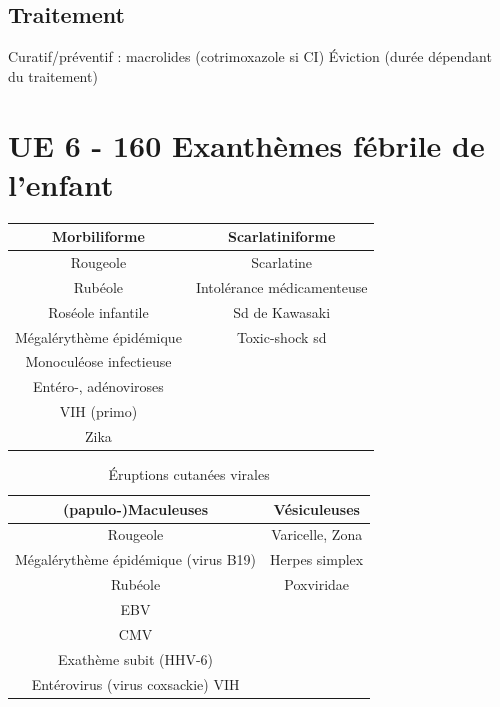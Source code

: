\subsection{Traitement}

Curatif/préventif : macrolides (cotrimoxazole si CI) Éviction (durée
dépendant du traitement) 

\section{UE 6 - 160 Exanthèmes fébrile de l'enfant}

\begin{table}[htpb]
  \centering
  \begin{tabular}{cc}
    \toprule
    Morbiliforme & Scarlatiniforme\\
    \midrule
    Rougeole & Scarlatine\\
    Rubéole & Intolérance médicamenteuse\\
    Roséole infantile & Sd de Kawasaki\\
    Mégalérythème épidémique & Toxic-shock sd\\
    Monoculéose infectieuse & \\
    Entéro-, adénoviroses & \\
    VIH (primo) & \\
    Zika  & \\
    \bottomrule
  \end{tabular}
\end{table}

\begin{table}[htpb]
  \centering
  \caption{Éruptions cutanées virales}
  \begin{tabular}{cc}

    \toprule
    (papulo-)Maculeuses & Vésiculeuses\\
    \midrule
    Rougeole & Varicelle, Zona\\
    Mégalérythème épidémique (virus B19) & Herpes simplex\\
    Rubéole & Poxviridae \\
    EBV &\\
    CMV &\\
    Exathème subit (HHV-6) & \\
    Entérovirus (virus coxsackie) VIH & \\
    \bottomrule

  \end{tabular}
\end{table}

